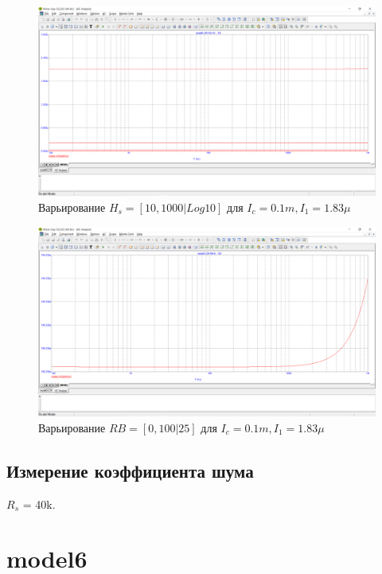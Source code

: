\documentclass[a4paper, 12pt]{article}%
\begin{document}
\subsubsection{}
\FloatBarrier
\begin{figure}
    \centering
    \includegraphics[scale = 0.4 \textwidth]{images/mod5_1_3_1.png}
    \caption{Варьирование $H_s = [10, 1000|Log10]$ для $I_c = 0.1m, I_1 = 1.83\mu$}
    \label{fig:m5131}
\end{figure}

\begin{figure}[h!]
    \centering
    \includegraphics[scale = 0.4 \textwidth]{images/mod5_1_3_2.png}
    \caption{Варьирование $RB = [0, 100|25]$ для $I_c = 0.1m, I_1 = 1.83\mu$}
    \label{fig:m5132}
\end{figure}
\FloatBarrier
\subsection{Измерение коэффициента шума}
\FloatBarrier
$R_s$ = 40k.

\section{\textbf{model6}}
\end{document}
